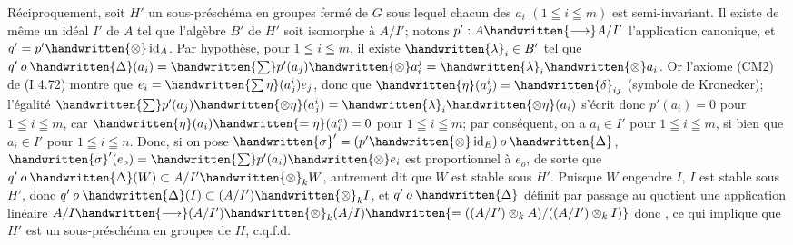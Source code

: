Réciproquement, soit $H'$ un sous-préschéma en groupes fermé de $G$ sous lequel chacun des $a_i$ $(1\leqq i\leqq m)$ est semi-invariant.  Il existe de même un idéal $I'$ de $A$ tel que l'algèbre $B'$ de $H'$ soit isomorphe à $A/I'$; notons $p':A\handwritten{\longrightarrow}A/I'$ l'application canonique, et $q'=p'\handwritten{\otimes}\operatorname{id}_A$. Par hypothèse, pour $1\leqq i\leqq m$, il existe $\handwritten{\lambda}_i\in B'$ tel que $q'\mathbin{o}\handwritten{\Delta}(a_i)=\handwritten{\sum}p'(a_j)\handwritten{\otimes}a_i^j=\handwritten{\lambda}_i\handwritten{\otimes}a_i$. Or l'axiome (CM2) de (I 4.72) montre que $e_i=\handwritten{\sum\eta}(a_j^i)e_j$, donc que $\handwritten{\eta}(a_j^i)=\handwritten{\delta}_{ij}$ (symbole de Kronecker); l'égalité $\handwritten{\sum}p'(a_j)\handwritten{\otimes\eta}(a_j^i)=\handwritten{\lambda}_i\handwritten{\otimes\eta}(a_i)$ s'écrit donc $p'(a_i)=0$ pour $1\leqq i\leqq m$, car $\handwritten{\eta}(a_i)\handwritten{=\eta}(a_i^o)=0$ pour $1\leqq i\leqq m$; par conséquent, on a $a_i\in I'$ pour $1\leqq i\leqq m$, si bien que $a_i\in I'$ pour $1\leqq i\leqq n$. Donc, si on pose $\handwritten{\sigma}'=(p'\handwritten{\otimes}\operatorname{id}_E)\mathbin{o}\handwritten{\Delta}$, $\handwritten{\sigma}'(e_o)=\handwritten{\sum}p'(a_i)\handwritten{\otimes}e_i$ est proportionnel à $e_o$, de sorte que $q'\mathbin{o}\handwritten{\Delta}(W)\subset A/I'\handwritten{\otimes}_k W$, autrement dit que $W$ est stable sous $H'$. Puisque $W$ engendre $I$, $I$ est stable sous $H'$, donc $q'\mathbin{o}\handwritten{\Delta}(I)\subset(A/I')\handwritten{\otimes}_k I$, et $q'\mathbin{o}\handwritten{\Delta}$ définit par passage au quotient une application linéaire $A/I\handwritten{\longrightarrow}(A/I')\handwritten{\otimes}_k(A/I)\handwritten{=((A/I')\otimes_k A)/((A/I')\otimes_k I)}$ donc , ce qui implique que $H'$ est  un sous-préschéma en groupes de $H$, c.q.f.d.

